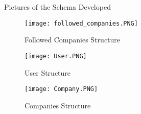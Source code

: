 \documentclass[twocolumn,twoside,11pt,a4paper]{article}
\begin{document}
\newpage
\newpage

\begin{appendices}

Pictures of the Schema Developed

\begin{figure}[ht!]
\centering
\texttt{[image: followed\_companies.PNG]}
\caption{Followed Companies Structure}
\label{fig:followed_companies}
\end{figure}

\begin{figure}[ht!]
\centering
\texttt{[image: User.PNG]}
\caption{User Structure}
\label{fig:user_structure}
\end{figure}

\begin{figure}[ht!]
\centering
\texttt{[image: Company.PNG]}
\caption{Companies Structure}
\label{fig:company_structure}
\end{figure}

\end{appendices}
\end{document}
